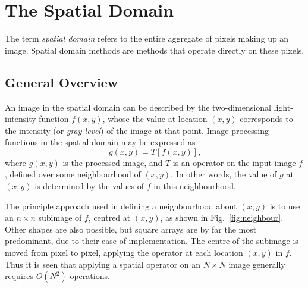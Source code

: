 
\section{The Spatial Domain}
\label{image:spatial}

The term {\em spatial domain\/} refers to the entire aggregate of
pixels making up an image.  Spatial domain methods are methods that
operate directly on these pixels.

\subsection{General Overview}
\label{image:spatial:overview}

An image in the spatial domain can be described by the two-dimensional
light-intensity function $f(x,y)$, whose the value at location $(x,y)$
corresponds to the intensity (or {\em gray level\/}) of the image at
that point.  Image-processing functions in the spatial domain may be
expressed as
\begin{equation}
\label{eq:spatial_operator}
g(x,y)=T[f(x,y)]\mbox{,}
\end{equation}
where $g(x,y)$ is the processed image, and $T$ is an operator on the
input image $f$, defined over some neighbourhood of $(x,y)$.  In other
words, the value of $g$ at $(x,y)$ is determined by the values of $f$
in this neighbourhood.


The principle approach used in defining a neighbourhood about $(x,y)$
is to use an $n\times n$ subimage of $f$, centred at $(x,y)$, as shown
in Fig.~\ref{fig:neighbour}.  Other shapes are also possible, but
square arrays are by far the most predominant, due to their ease of
implementation.  The centre of the subimage is moved from pixel to
pixel, applying the operator at each location $(x,y)$ in $f$.  Thus it
is seen that applying a spatial operator on an $N\times N$ image
generally requires $O(N^{2})$ operations.


